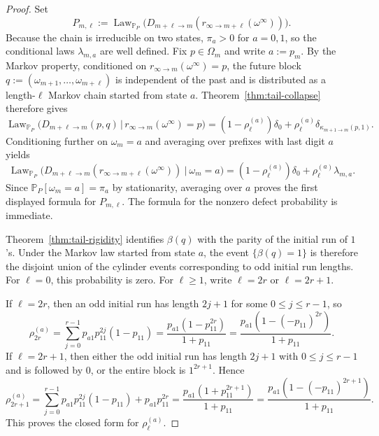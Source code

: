 \documentclass[11pt,reqno]{amsart}
\numberwithin{equation}{section}
\theoremstyle{plain}
\theoremstyle{definition}
\theoremstyle{remark}
\newcommand{\PP}{\mathbb{P}}
\DeclareMathOperator{\Law}{Law}
\begin{document}
\begin{proof}
Set
\[
P_{m,\ell}
:=
\Law_{\PP_P}\!\bigl(D_{m+\ell\to m}(r_{\infty\to m+\ell}(\omega^\infty))\bigr).
\]
Because the chain is irreducible on two states, $\pi_a>0$ for $a=0,1$, so the
conditional laws $\lambda_{m,a}$ are well defined.
Fix $p\in\Omega_m$ and write $a:=p_m$.  By the Markov property, conditioned on
$r_{\infty\to m}(\omega^\infty)=p$, the future block
$q:=(\omega_{m+1},\dots,\omega_{m+\ell})$ is independent of the past and is
distributed as a length-$\ell$ Markov chain started from state $a$.
Theorem~\ref{thm:tail-collapse} therefore gives
\[
\Law_{\PP_P}\!\bigl(D_{m+\ell\to m}(p,q)\,\big|\,r_{\infty\to m}(\omega^\infty)=p\bigr)
=
(1-\rho_\ell^{(a)})\delta_0+\rho_\ell^{(a)}\delta_{\kappa_{m+1\to m}(p,1)}.
\]
Conditioning further on $\omega_m=a$ and averaging over prefixes with last
digit $a$ yields
\[
\Law_{\PP_P}\!\bigl(
D_{m+\ell\to m}(r_{\infty\to m+\ell}(\omega^\infty))
\ \big|\ \omega_m=a
\bigr)
=
(1-\rho_\ell^{(a)})\delta_0+\rho_\ell^{(a)}\lambda_{m,a}.
\]
Since $\PP_P[\omega_m=a]=\pi_a$ by stationarity, averaging over $a$ proves the
first displayed formula for $P_{m,\ell}$.  The formula for the nonzero defect
probability is immediate.

Theorem~\ref{thm:tail-rigidity} identifies $\beta(q)$ with the parity of the
initial run of $1$'s.  Under the Markov law started from state $a$, the event
$\{\beta(q)=1\}$ is therefore the disjoint union of the cylinder events
corresponding to odd initial run lengths.  For $\ell=0$, this probability is
zero.  For $\ell\ge 1$, write $\ell=2r$ or $\ell=2r+1$.

If $\ell=2r$, then an odd initial run has length $2j+1$ for some
$0\le j\le r-1$, so
\[
\rho_{2r}^{(a)}
=
\sum_{j=0}^{r-1} p_{a1}p_{11}^{2j}(1-p_{11})
=
\frac{p_{a1}(1-p_{11}^{2r})}{1+p_{11}}
=
\frac{p_{a1}(1-(-p_{11})^{2r})}{1+p_{11}}.
\]
If $\ell=2r+1$, then either the odd initial run has length $2j+1$ with
$0\le j\le r-1$ and is followed by $0$, or the entire block is $1^{2r+1}$.
Hence
\[
\rho_{2r+1}^{(a)}
=
\sum_{j=0}^{r-1} p_{a1}p_{11}^{2j}(1-p_{11})
+ p_{a1}p_{11}^{2r}
=
\frac{p_{a1}(1+p_{11}^{2r+1})}{1+p_{11}}
=
\frac{p_{a1}(1-(-p_{11})^{2r+1})}{1+p_{11}}.
\]
This proves the closed form for $\rho_\ell^{(a)}$.


\end{proof}
\end{document}
